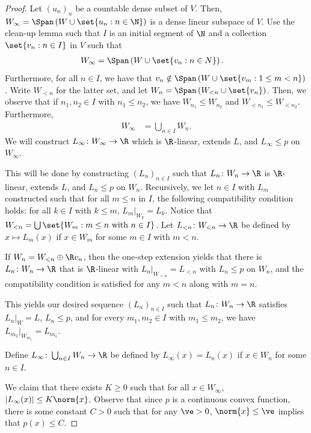 \documentclass[10pt]{mypackage}
\begin{document}
\begin{proof}
  Let $\left( u_n \right)_n$ be a countable dense subset of $V$. Then, $W_{\infty} = \Span\left( W \cup \set{u_n : n\in \N} \right)$ is a dense linear subspace of $V$. Use the clean-up lemma such that $I$ is an initial segment of $\N$ and a collection $\set{v_n : n\in I}$ in $V$ such that 
  \begin{align*}
    W_{\infty} &= \Span\left( W\cup \set{v_n : n\in N} \right).
  \end{align*}
  Furthermore, for all $n\in I$, we have that $v_n\notin \Span\left( W \cup \set{v_m : 1\leq m < n} \right)$. Write $W_{<n}$ for the latter set, and let $W_n = \Span\left( W_{<n}\cup \set{v_n} \right)$. Then, we observe that if $n_1,n_2\in I$ with $n_1 \leq n_2$, we have $W_{n_1}\leq W_{n_2}$ and $W_{< n_1}\leq W_{< n_2}$. Furthermore,
  \begin{align*}
    W_{\infty} &= \bigcup_{n\in I}W_n.
  \end{align*}
  We will construct $L_{\infty}\colon W_{\infty}\to \R$ which is $\R$-linear, extends $L$, and $L_{\infty}\leq p$ on $W_{\infty}$.

  This will be done by constructing $\left( L_n \right)_{n\in I}$ such that $L_{n}\colon W_n\to \R$ is $\R$-linear, extends $L$, and $L_{n}\leq p$ on $W_n$. Recursively, we let $n\in I$ with $L_m$ constructed such that for all $m\leq n$ in $I$, the following compatibility condition holds: for all $k\in I$ with $k\leq m$, $L_m|_{W_k} = L_k$. Notice that $W_{ < n } = \bigcup\set{W_m : m\leq n\text{ with }n\in I}$. Let $L_{ < n }\colon W_{ < n }\to \R$ be defined by $x\mapsto L_{m}(x)$ if $x\in W_m$ for some $m\in I$ with $m < n$.

  If $W_n = W_{ < n }\oplus \R v_n$, then the one-step extension yields that there is $L_n\colon W_n\to \R$ that is $\R$-linear with $L_n|_{W_{ < n }} = L_{ < n }$ with $L_n\leq p$ on $W_n$, and the compatibility condition is satisfied for any $m < n$ along with $m = n$.

  This yields our desired sequence $\left( L_n \right)_{n\in I}$ such that $L_n\colon W_n\to \R$ satisfies $L_n|_{W} = L$, $L_n\leq p$, and for every $m_1,m_2\in I$ with $m_1\leq m_2$, we have $L_{m_2}|_{W_{m_1}} = L_{m_1}$.

  Define $L_{\infty}\colon \bigcup_{n\in I}W_n\to \R$ be defined by $L_{\infty}\left( x \right) = L_n(x)$ if $x\in W_n$ for some $n\in I$.

  We claim that there exists $K\geq 0$ such that for all $x\in W_{\infty}$, $\left\vert L_{\infty}(x) \right\vert\leq K\norm{x}$. Observe that since $p$ is a continuous convex function, there is some constant $C > 0$ such that for any $\ve > 0$, $\norm{x}\leq \ve$ implies that $p(x)\leq C$.


\end{proof}
\end{document}
